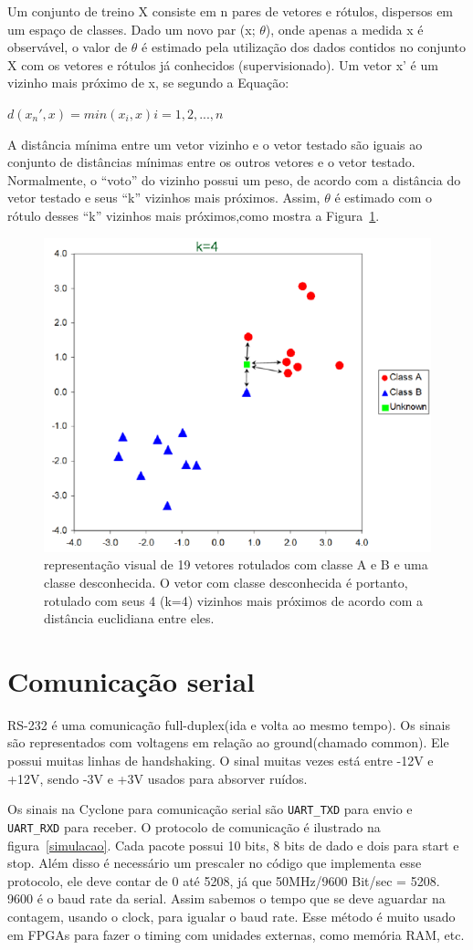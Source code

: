 \documentclass[12pt]{article}
\begin{document}
Um conjunto de treino X consiste em n pares de vetores e rótulos, dispersos em
um espaço de classes. Dado um novo par (x; $\theta$), onde apenas a medida x é
observável, o valor de $\theta$	é estimado pela utilização dos dados contidos
no conjunto X com os vetores e rótulos já conhecidos (supervisionado). Um vetor
x' é um vizinho mais próximo de x, se segundo a Equação:

$d(x_{n}', x) = min(x_i, x) i = 1, 2, ...,n$

A distância mínima entre um vetor vizinho e o vetor testado são iguais ao 
conjunto de distâncias mínimas entre os outros vetores e o vetor testado. 
Normalmente, o ``voto'' do vizinho possui um peso, de acordo com a distância do
vetor testado e seus ``k'' vizinhos mais próximos. Assim, $\theta$ é estimado 
com o rótulo desses ``k'' vizinhos mais próximos,como mostra a 
Figura~\ref{fig:fig1}.

\begin{figure}[!hb]
	\centering
	\includegraphics[width=.3\textwidth]{img/knn.png}
	\caption{representação visual de 19 vetores rotulados com classe A e B e uma
	classe desconhecida. O vetor com classe desconhecida é portanto, rotulado
	com seus 4 (k=4) vizinhos mais próximos de acordo com a distância euclidiana
	entre eles.}
	\label{fig:fig1}
\end{figure}

\section{Comunicação serial}

RS-232 é uma comunicação full-duplex(ida e volta ao mesmo tempo). Os sinais são
representados com voltagens em relação ao ground(chamado common). Ele possui 
muitas linhas de handshaking. O sinal muitas vezes está entre -12V e +12V,
sendo -3V e +3V usados para absorver ruídos.

Os sinais na Cyclone para comunicação serial são \verb|UART_TXD| para envio e
\verb|UART_RXD| para receber. O protocolo de comunicação é ilustrado na 
figura~\ref{simulacao}. Cada pacote possui 10 bits, 8 bits de dado e dois para
start e stop. Além disso é necessário um prescaler no código que implementa esse
protocolo, ele deve contar de 0 até 5208, já que 50MHz/9600 Bit/sec = 5208. 9600
é o baud rate da serial. Assim sabemos o tempo que se deve aguardar na contagem,
usando o clock, para igualar o baud rate. Esse método é muito usado em FPGAs
para fazer o timing com unidades externas, como memória RAM, etc.
\end{document}
